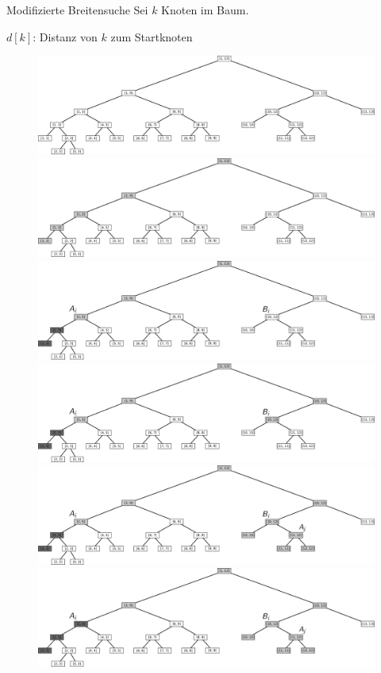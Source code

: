 \documentclass{beamer}
\begin{document}
	\begin{frame}[t]{Modifizierte Breitensuche}
		Sei $k$ Knoten im Baum. 
		
		$d[k]$: Distanz von $k$ zum Startknoten
		\begin{figure}
			\begin{overprint}
				\includegraphics[width=\textwidth]{split_tree.png}
				\onslide<2>\includegraphics[width=\textwidth]{bfs_step1.png}
				\onslide<3>\includegraphics[width=\textwidth]{bfs_step2.png}
				\onslide<4>\includegraphics[width=\textwidth]{bfs_step3.png}
				\onslide<5>\includegraphics[width=\textwidth]{bfs_step4.png}
				\onslide<6>\includegraphics[width=\textwidth]{bfs_step5.png}
			\end{overprint}
		\end{figure}
		

\end{frame}
\end{document}
